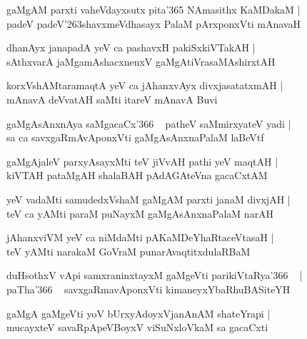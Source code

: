 \documentclass[twoside,12pt,openright]{book}
\def\S{\char'263}
\newcounter{shloka}[chapter]
\begin{document}
\begin{shloka}%
gaMgAM parxti vaheVdayxsutx pita\char'365 NAmasithx KaMDakaM |\\
padeV padeV\S shavxmeVdhasayx PalaM pArxponxVti mAnavaH 
\end{shloka}

\begin{shloka}%
dhanAyx janapadA yeV ca pashavxH pakiSxkiVTakAH |\\
sAthxvarA jaMgamAshacxnenxV gaMgAtiVrasaMAshirxtAH 
\end{shloka}

\begin{shloka}%
korxVshAMtaramaqtA yeV ca jAhanxvAyx divxjasatatxmAH |\\
mAnavA deVvatAH saMti itareV mAnavA Buvi
\end{shloka}

\begin{shloka}%
gaMgAsAnxnAya saMgacaCx\char'366 ~ patheV saMmirxyateV yadi |\\
sa ca savxgaRmAvAponxVti gaMgAsAnxnaPalaM laBeVtf 
\end{shloka}

\begin{shloka}%
gaMgAjaleV parxyAsayxMti teV jiVvAH pathi yeV maqtAH |\\
kiVTAH pataMgAH shalaBAH pAdAGAteVna gacaCxtAM 
\end{shloka}

\begin{shloka}%
yeV vadaMti samudedxVshaM gaMgAM parxti janaM divxjAH |\\
teV ca yAMti paraM puNayxM gaMgAsAnxnaPalaM narAH 
\end{shloka}

\begin{shloka}%
jAhanxviVM yeV ca niMdaMti pAKaMDeYhaRtaceVtasaH |\\
teV yAMti narakaM GoVraM punarAvaqtitxdulaRBaM 
\end{shloka}

\begin{shloka}%
duHsothxV vApi samxraninxtayxM gaMgeVti parikiVtaRya\char'366 ~ |\\
paTha\char'366 ~ savxgaRmavAponxVti kimaneyxYbaRhuBASiteYH 
\end{shloka}

\begin{shloka}%
gaMgA gaMgeVti yoV bUrxyAdoyxVjanAnAM shateYrapi |\\
mucayxteV savaRpApeVBoyxV viSuNxloVkaM sa gacaCxti 
\end{shloka}
\end{document}
